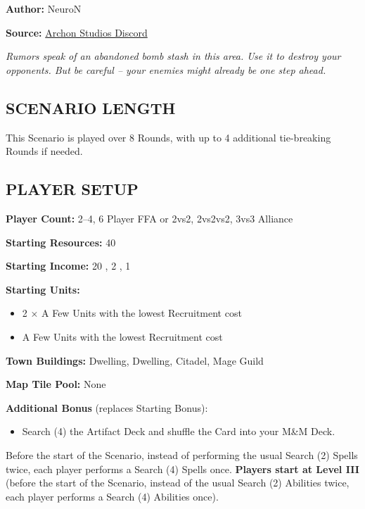 
\begin{multicols}{2}

\textbf{Author:} NeuroN

\textbf{Source:} \href{https://discord.com/channels/740870068178649108/1278750250722525203/1278750250722525203}{Archon Studios Discord}

\textit{Rumors speak of an abandoned bomb stash in this area.
Use it to destroy your opponents.
But be careful -- your enemies might already be one step ahead.}

\subsection*{\MakeUppercase{Scenario Length}}
This Scenario is played over 8 Rounds, with up to 4 additional tie-breaking Rounds if needed.

\subsection*{\MakeUppercase{Player Setup}}
\textbf{Player Count:} 2--4, 6 Player FFA or 2vs2, 2vs2vs2, 3vs3 Alliance

\textbf{Starting Resources:} 40 

\textbf{Starting Income:} 20 , 2 , 1 

\textbf{Starting Units:}
\begin{itemize}
  \item 2 × A Few  Units with the lowest Recruitment cost
  \item A Few  Units with the lowest Recruitment cost
\end{itemize}

\textbf{Town Buildings:}  Dwelling,  Dwelling, Citadel, Mage Guild

\textbf{Map Tile Pool:} None

\textbf{Additional Bonus} (replaces Starting Bonus):

\begin{itemize}
  \item Search (4) the Artifact Deck and shuffle the Card into your M\&M Deck.
\end{itemize}
Before the start of the Scenario, instead of performing the usual Search (2) Spells twice, each player performs a Search (4) Spells once.
\textbf{Players start at Level III} (before the start of the Scenario, instead of the usual Search (2) Abilities twice, each player performs a Search (4) Abilities once).


\end{multicols}
